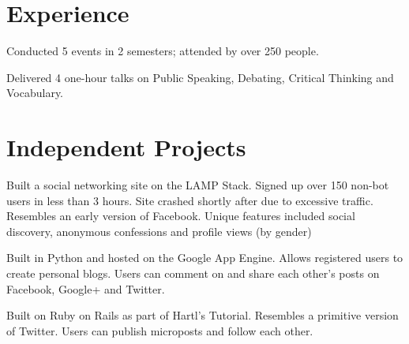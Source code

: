 \documentclass[]{deedy-resume-openfont}
\begin{document}
\begin{minipage}[t]{0.66\textwidth} 


\section{Experience}

\vspace{\topsep} %
\begin{tightemize}
\item Conducted 5 events in 2 semesters; attended by over 250 people. 
\item Delivered 4 one-hour
talks on Public Speaking, Debating, Critical Thinking and Vocabulary.
\end{tightemize}
\sectionsep



\section{Independent Projects}
Built a social networking site on the LAMP Stack.
Signed up over 150 non-bot users in less than 3 hours. Site crashed shortly after
due to excessive traffic.
Resembles an early version of Facebook. Unique features included social discovery, anonymous confessions and profile views (by gender)
\sectionsep

Built in Python and hosted on the Google App Engine.
Allows registered users to create personal blogs. Users can comment on and share each
other's posts on Facebook, Google+ and Twitter.
\sectionsep

Built on Ruby on Rails as part of Hartl's Tutorial. Resembles a primitive version of Twitter. Users can publish microposts and follow each other.
\sectionsep


\end{minipage}
\end{document}
